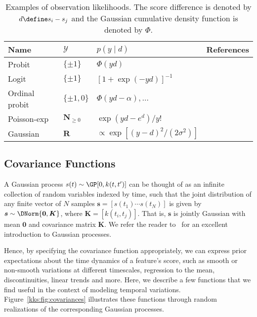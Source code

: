 \begin{table}
	\centering
	\caption{
		Examples of observation likelihoods.
		The score difference is denoted by $d \define s_i - s_j$ and the Gaussian cumulative density function is denoted by $\Phi$.
	}
	\label{kks:tab:likelihoods}
	\centering
	\begin{tabular}{l lll}
		\toprule
		Name           & $\mathcal{Y}$        & $p(y \mid d)$                           & References                                      \\
		\midrule
		Probit         & $\{\pm 1 \}$         & $\Phi(yd)$                              & \citep{thurstone1927law, herbrich2006trueskill} \\
		Logit          & $\{\pm 1 \}$         & $[1 + \exp(-yd)]^{-1}$                  & \citep{zermelo1928berechnung, bradley1952rank}  \\
		Ordinal probit & $\{\pm 1, 0 \}$      & $\Phi(yd - \alpha), \ldots$             & \citep{glenn1960ties}                           \\
		Poisson-exp    & $\mathbf{N}_{\ge 0}$ & $\exp(yd - e^d) / y!$                   & \citep{maher1982modelling}                      \\
		Gaussian       & $\mathbf{R}$         & $\propto \exp[(y - d)^2 / (2\sigma^2)]$ & \citep{guo2012score}                            \\
		\bottomrule
	\end{tabular}
\end{table}


\subsection{Covariance Functions}
\label{kks:sec:covariances}

A Gaussian process $s(t) \sim \GP[0, k(t, t')]$ can be thought of as an infinite collection of random variables indexed by time, such that the joint distribution of any finite vector of $N$ samples $\bm{s} = [s(t_1) \cdots s(t_N)]$ is given by $\bm{s} \sim \DNorm{\bm{0}, \bm{K}}$, where $\bm{K} = [k(t_i, t_j)]$.
That is, $\bm{s}$ is jointly Gaussian with mean $\bm{0}$ and covariance matrix $\bm{K}$.
We refer the reader to~\citet{rasmussen2006gaussian} for an excellent introduction to Gaussian processes.

Hence, by specifying the covariance function appropriately, we can express prior expectations about the time dynamics of a feature's score, such as smooth or non-smooth variations at different timescales, regression to the mean, discontinuities, linear trends and more.
Here, we describe a few functions that we find useful in the context of modeling temporal variations.
Figure~\ref{kks:fig:covariances} illustrates these functions through random realizations of the corresponding Gaussian processes.

